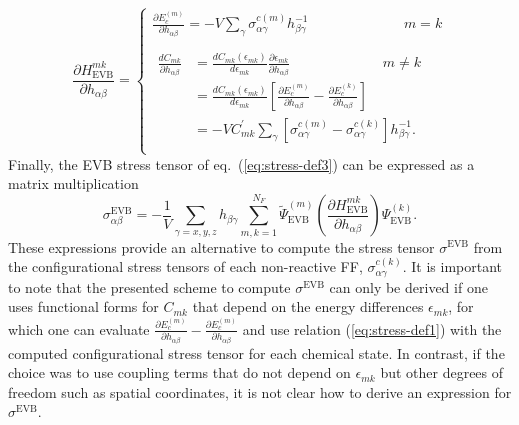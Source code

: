 \begin{equation}\label{eq:stress-EVB-mat}
\frac{\partial H^{mk}_{\text{EVB}}}{\partial h_{\alpha\beta}}=\begin{cases}
  \frac{\partial E_{c}^{(m)}}{\partial h_{\alpha\beta}}=-V\sum_{\gamma}\sigma_{\alpha\gamma}^{c(m)}h^{-1}_{\beta\gamma} \,\,\,\,\,\,\,\,\,\,\,\,\,\,\,\,\,\,\,\,\,\,\,\,\,\,\,\,\,\,\,\,\,\,\,\,\,\,\,\,\, m=k  \\
\\
\begin{aligned}
\frac{d C_{mk}}{\partial h_{\alpha\beta}}&= \frac{d C_{mk}(\epsilon_{mk})}{d \epsilon_{mk}}\frac{\partial \epsilon_{mk}}{\partial h_{\alpha\beta}}
  \,\,\,\,\,\,\,\,\,\,\,\,\,\,\,\, \,\,\,\,\,\,\,\, \,\,\,\,\,\,\,\, \,\,\,\,\,\,\,\,    m \ne k
\\ 
                                                              &= \frac{d C_{mk}(\epsilon_{mk})}{d\epsilon_{mk}}\left[\frac{\partial E_{c}^{(m)}}{\partial h_{\alpha\beta}}-\frac{\partial E_{c}^{(k)}}{\partial h_{\alpha\beta}} \right]\
\\
                                                              &=-VC^{\prime}_{mk}\sum_{\gamma}[\sigma_{\alpha\gamma}^{c(m)}-\sigma_{\alpha\gamma}^{c(k)}] h^{-1}_{\beta\gamma}.\\
\end{aligned}
\end{cases} \nonumber 
\end{equation}
Finally, the EVB stress tensor of eq.~(\ref{eq:stress-def3}) can be expressed as a matrix multiplication
\begin{equation}\label{eq:stress-EVB-ab}
\sigma_{\alpha\beta}^{\text{EVB}}=-\frac{1}{V}\sum_{\gamma=x,y,z}h_{\beta\gamma}\sum_{m,k=1}^{N_F} \tilde{\Psi}^{(m)}_{\text{EVB}} \left(\frac{\partial H^{mk}_{\text{EVB}}}{\partial h_{\alpha\beta}}\right) \Psi^{(k)}_{\text{EVB}}.
\end{equation}
These expressions provide an alternative to compute the stress tensor $\sigma^{\text{EVB}}$ from the configurational stress tensors of each non-reactive FF, $\sigma_{\alpha\gamma}^{c(k)}$. It is important to note that the presented scheme to compute $\sigma^{\text{EVB}}$ can only be derived if one uses functional forms for $C_{mk}$ that depend on the energy differences $\epsilon_{mk}$, for which one can evaluate $\frac{\partial E_{c}^{(m)}}{\partial h_{\alpha\beta}}-\frac{\partial E_{c}^{(m)}}{\partial h_{\alpha\beta}}$ and use relation (\ref{eq:stress-def1}) with the computed configurational stress tensor for each chemical state. In contrast, if the choice was to use coupling terms that do not depend on $\epsilon_{mk}$ but other degrees of freedom such as spatial coordinates, it is not clear how to derive an expression for $\sigma^{\text{EVB}}$. \\
